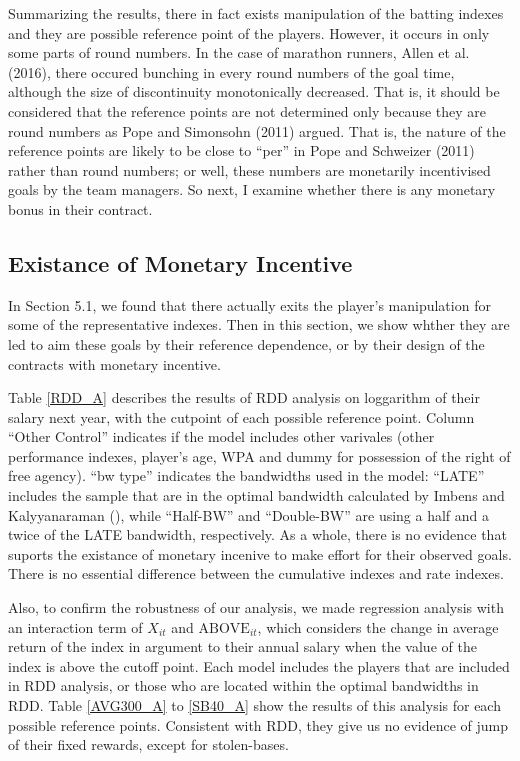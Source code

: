 \documentclass[dvipdfmx, 12pt]{article}
\begin{document}
Summarizing the results, there in fact exists manipulation of the batting indexes and they are possible reference point of the players. However, it occurs in only some parts of round numbers. In the case of marathon runners, Allen et al. (2016), there occured bunching in every round numbers of the goal time, although the size of discontinuity monotonically decreased. That is, it should be considered that the reference points are not determined only because they are round numbers as Pope and Simonsohn (2011) argued. That is, the nature of the reference points are likely to be close to ``per'' in Pope and Schweizer (2011) rather than round numbers; or well, these numbers are monetarily incentivised goals by the team managers. So next, I examine whether there is any monetary bonus in their contract.

\subsection{Existance of Monetary Incentive}

In Section 5.1, we found that there actually exits the player's manipulation for some of the representative indexes. Then in this section, we show whther they are led to aim these goals by their reference dependence, or by their design of the contracts with monetary incentive.

Table \ref{RDD_A} describes the results of RDD analysis on loggarithm of their salary next year, with the cutpoint of each possible reference point. Column ``Other Control'' indicates if the model includes other varivales (other performance indexes, player's age, WPA and dummy for possession of the right of free agency). ``bw type'' indicates the bandwidths used in the model: ``LATE'' includes the sample that are in the optimal bandwidth calculated by Imbens and Kalyyanaraman (), while ``Half-BW'' and ``Double-BW'' are using a half and a twice of the LATE bandwidth, respectively. As a whole, there is no evidence that suports the existance of monetary incenive to make effort for their observed goals. There is no essential difference between the cumulative indexes and rate indexes.

Also, to confirm the robustness of our analysis, we made regression analysis with an interaction term of $X_{it}$ and $\text{ABOVE}_{it}$, which considers the change in average return of the index in argument to their annual salary when the value of the index is above the cutoff point. Each model includes the players that are included in RDD analysis, or those who are located within the optimal bandwidths in RDD. Table \ref{AVG300_A} to \ref{SB40_A} show the results of this analysis for each possible reference points. Consistent with RDD, they give us no evidence of jump of their fixed rewards, except for stolen-bases.
\end{document}
